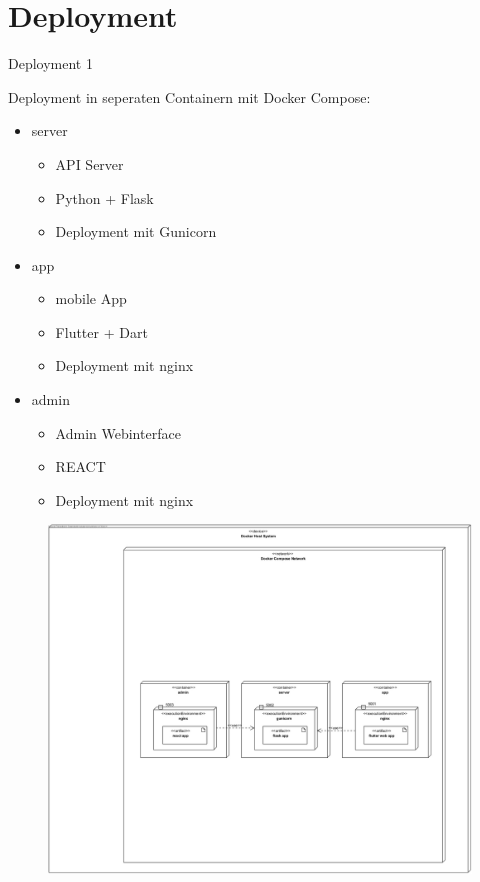 \section{Deployment}

\begin{frame}{Deployment 1}
    \begin{minipage}[t]{0.35\textwidth}
        Deployment in seperaten Containern mit Docker Compose:
        \begin{itemize}
            \item server
            \begin{itemize} 
                \item API Server
                \item Python + Flask
                \item Deployment mit Gunicorn
            \end{itemize}
            \item app
            \begin{itemize} 
                \item mobile App
                \item Flutter + Dart
                \item Deployment mit nginx
            \end{itemize}
            \item admin
            \begin{itemize} 
                \item Admin Webinterface
                \item REACT
                \item Deployment mit nginx
            \end{itemize}
        \end{itemize}
    \end{minipage}
    \hfill
    \begin{minipage}[t]{0.63\textwidth}
        \begin{figure}
            \begin{center}
                \includegraphics[width=\textwidth]{images/deployment/deployment_diagram_services.jpg}

\end{center}
\end{figure}
\end{minipage}
\end{frame}
